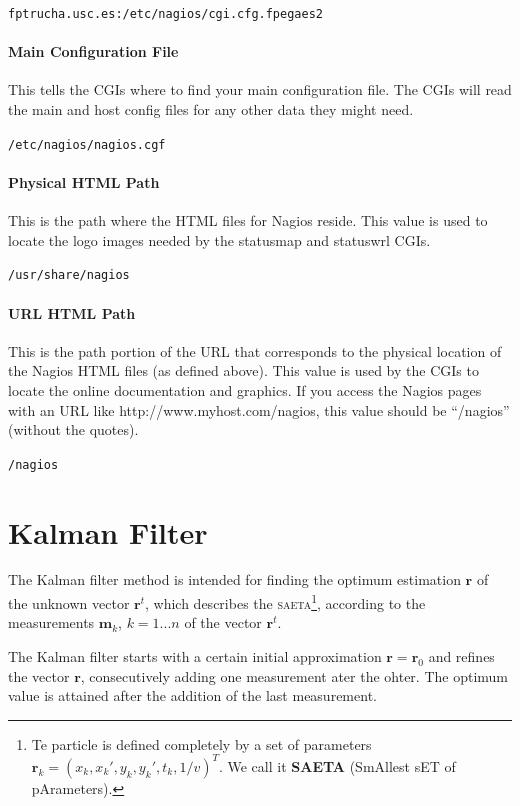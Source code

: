 \documentclass[a4paper]{book}
\let\vec\mathbf  %
\begin{document}
\texttt{fptrucha.usc.es:/etc/nagios/cgi.cfg.fpegaes2}

\subsubsection{Main Configuration File}
This tells the CGIs where to find your main configuration file. The CGIs will read the main and host config files for any other data they might need.

\texttt{/etc/nagios/nagios.cgf}


\subsubsection{Physical HTML Path}
This is the path where the HTML files for Nagios reside.  This value is used to locate the logo images needed by the statusmap and statuswrl CGIs.

\texttt{/usr/share/nagios}


\subsubsection{URL HTML Path}
This is the path portion of the URL that corresponds to the physical location of the Nagios HTML files (as defined above). This value is used by the CGIs to locate the online documentation and graphics.  If you access the Nagios pages with an URL like
http://www.myhost.com/nagios, 
this value should be ``/nagios'' (without the quotes).

\texttt{/nagios}





\chapter{Kalman Filter}

The Kalman filter method is intended for finding the optimum estimation $\vec{r}$ of the unknown vector $\vec{r}^t$, which describes the \textsc{saeta}\footnote{Te particle is defined completely by a set of parameters $\vec{r}_k = (x_k, x_k', y_k, y_k', t_k, 1/v)^T$. We call it \textbf{SAETA} (SmAllest sET of pArameters).}, according to the measurements $\vec{m}_k$, $k = 1 ... n$ of the vector $\vec{r}^t$.

The Kalman filter starts with a certain initial approximation $\vec{r} = \vec{r}_0$ and refines the vector $\vec{r}$, consecutively adding one measurement ater the ohter. The optimum value is attained after the addition of the last measurement.
\end{document}
